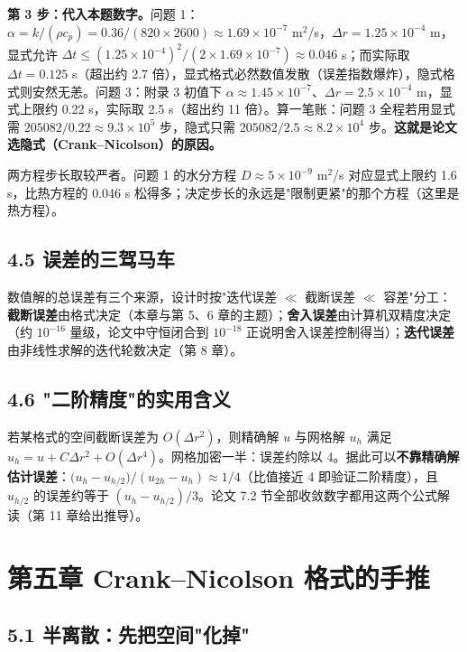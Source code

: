 \documentclass[12pt,a4paper]{ctexart}
\newcommand{\why}[1]{\par\smallskip\noindent{\heiti 【为什么要这样做】}#1\par\smallskip}
\begin{document}
\textbf{第 3 步：代入本题数字。}问题 1：$\alpha=k/(\rho c_p)=0.36/(820\times2600)\approx1.69\times10^{-7}$ m$^2$/s，$\Delta r=1.25\times10^{-4}$ m，显式允许 $\Delta t\le(1.25\times10^{-4})^2/(2\times1.69\times10^{-7})\approx0.046$ s；而实际取 $\Delta t=0.125$ s（超出约 2.7 倍），显式格式必然数值发散（误差指数爆炸），隐式格式则安然无恙。问题 3：附录 3 初值下 $\alpha\approx1.45\times10^{-7}$、$\Delta r=2.5\times10^{-4}$ m，显式上限约 0.22 s，实际取 2.5 s（超出约 11 倍）。算一笔账：问题 3 全程若用显式需 $205082/0.22\approx9.3\times10^5$ 步，隐式只需 $205082/2.5\approx8.2\times10^4$ 步。\textbf{这就是论文选隐式（Crank--Nicolson）的原因。}

\why{两方程步长取较严者。问题 1 的水分方程 $D\approx5\times10^{-9}$ m$^2$/s 对应显式上限约 1.6 s，比热方程的 0.046 s 松得多；决定步长的永远是"限制更紧"的那个方程（这里是热方程）。}

\subsection{4.5 误差的三驾马车}

数值解的总误差有三个来源，设计时按"迭代误差 $\ll$ 截断误差 $\ll$ 容差"分工：\textbf{截断误差}由格式决定（本章与第 5、6 章的主题）；\textbf{舍入误差}由计算机双精度决定（约 $10^{-16}$ 量级，论文中守恒闭合到 $10^{-18}$ 正说明舍入误差控制得当）；\textbf{迭代误差}由非线性求解的迭代轮数决定（第 8 章）。

\subsection{4.6 "二阶精度"的实用含义}

若某格式的空间截断误差为 $O(\Delta r^2)$，则精确解 $u$ 与网格解 $u_h$ 满足 $u_h=u+C\Delta r^2+O(\Delta r^4)$。网格加密一半：误差约除以 4。据此可以\textbf{不靠精确解估计误差}：$\bigl(u_h-u_{h/2}\bigr)/(u_{2h}-u_h)\approx1/4$（比值接近 4 即验证二阶精度），且 $u_{h/2}$ 的误差约等于 $(u_h-u_{h/2})/3$。论文 7.2 节全部收敛数字都用这两个公式解读（第 11 章给出推导）。

\section{第五章 Crank--Nicolson 格式的手推}

\subsection{5.1 半离散：先把空间"化掉"}
\end{document}
